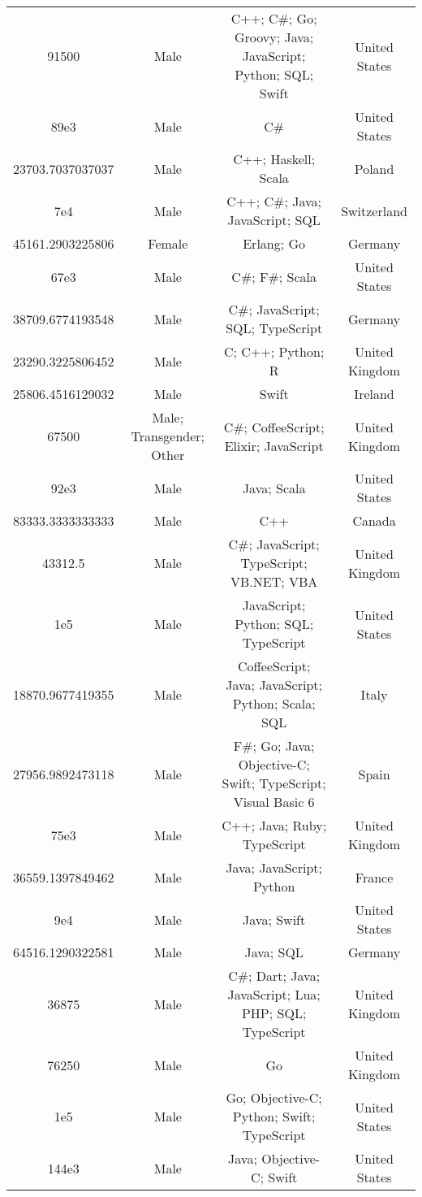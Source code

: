 \begin{center}
\begin{tabular}{ |c|c|c|c| }
91500  &  Male  &  C++; C\#; Go; Groovy; Java; JavaScript; Python; SQL; Swift  &  United States  \\ 
89e3  &  Male  &  C\#  &  United States  \\ 
23703.7037037037  &  Male  &  C++; Haskell; Scala  &  Poland  \\ 
7e4  &  Male  &  C++; C\#; Java; JavaScript; SQL  &  Switzerland  \\ 
45161.2903225806  &  Female  &  Erlang; Go  &  Germany  \\ 
67e3  &  Male  &  C\#; F\#; Scala  &  United States  \\ 
38709.6774193548  &  Male  &  C\#; JavaScript; SQL; TypeScript  &  Germany  \\ 
23290.3225806452  &  Male  &  C; C++; Python; R  &  United Kingdom  \\ 
25806.4516129032  &  Male  &  Swift  &  Ireland  \\ 
67500  &  Male; Transgender; Other  &  C\#; CoffeeScript; Elixir; JavaScript  &  United Kingdom  \\ 
92e3  &  Male  &  Java; Scala  &  United States  \\ 
83333.3333333333  &  Male  &  C++  &  Canada  \\ 
43312.5  &  Male  &  C\#; JavaScript; TypeScript; VB.NET; VBA  &  United Kingdom  \\ 
1e5  &  Male  &  JavaScript; Python; SQL; TypeScript  &  United States  \\ 
18870.9677419355  &  Male  &  CoffeeScript; Java; JavaScript; Python; Scala; SQL  &  Italy  \\ 
27956.9892473118  &  Male  &  F\#; Go; Java; Objective-C; Swift; TypeScript; Visual Basic 6  &  Spain  \\ 
75e3  &  Male  &  C++; Java; Ruby; TypeScript  &  United Kingdom  \\ 
36559.1397849462  &  Male  &  Java; JavaScript; Python  &  France  \\ 
9e4  &  Male  &  Java; Swift  &  United States  \\ 
64516.1290322581  &  Male  &  Java; SQL  &  Germany  \\ 
36875  &  Male  &  C\#; Dart; Java; JavaScript; Lua; PHP; SQL; TypeScript  &  United Kingdom  \\ 
76250  &  Male  &  Go  &  United Kingdom  \\ 
1e5  &  Male  &  Go; Objective-C; Python; Swift; TypeScript  &  United States  \\ 
144e3  &  Male  &  Java; Objective-C; Swift  &  United States  \\ 

\end{tabular}
\end{center}
